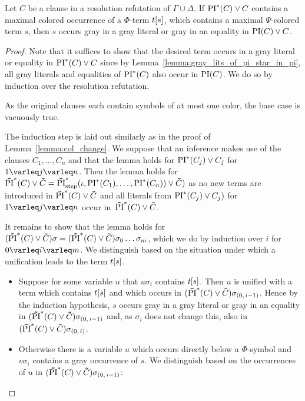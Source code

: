 \documentclass[%
	draft=false,%
	numbers=noendperiod,%
	11pt,%
	a4paper,%
	oneside,%
	openany,%
]{memoir}
\begin{document}
\begin{lemma}
	\label{lemma:subterm_in_gray_lit}
	Let $C$ be a clause in a resolution refutation of $\Gamma \cup \Delta$.
	If $\operatorname{PI}^*(C) \lor C$ contains a maximal colored occurrence of a $\Phi$-term $t[s]$, which contains a maximal $\Psi$-colored term $s$, then $s$ occurs gray in a gray literal or gray in an equality in $\operatorname{PI}(C) \lor C$.
\end{lemma}
\begin{proof}
	Note that it suffices to show that the desired term occurs in a gray literal or equality in $\operatorname{PI}^*(C) \lor C$
	since by Lemma~\ref{lemma:gray_lits_of_pi_star_in_pi}, all gray literals and equalities of $\operatorname{PI}^*(C)$ also occur in $\operatorname{PI}(C)$.
	We do so by induction over the resolution refutation.
	
	As the original clauses each contain symbols of at most one color, the base case is vacuously true.

	The induction step is laid out similarly as in the proof of Lemma~\ref{lemma:col_change}. 
	We suppose that an inference makes use of the clauses $C_1, \dots, C_n$ and that the lemma holds for $\operatorname{PI}^*(C_j) \lor C_j$ for $1\varleq j \varleq n$. 
	Then the lemma holds for $\bm\tilde{\operatorname{PI}}^{*}(C)\lor \bm\tilde{C} = \bm\tilde{\operatorname{PI}}^{*}_{\mathrm{step}}(\iota, \operatorname{PI}^*(C_1), \dots, \operatorname{PI}^*(C_n)) \lor \bm\tilde{C})$ as no new terms are introduced in $\bm\tilde{\operatorname{PI}}^{*}(C)\lor \bm\tilde{C}$ and all literals from $\operatorname{PI}^*(C_j) \lor C_j)$ for $1\varleq j \varleq n$ occur in~$\bm\tilde{\operatorname{PI}}^{*}(C)\lor \bm\tilde{C}$.

	It remains to show that the lemma holds for $(\bm\tilde{\operatorname{PI}}^{*}(C)\lor \bm\tilde{C})\sigma = (\bm\tilde{\operatorname{PI}}^{*}(C)\lor \bm\tilde{C})\sigma_0 \dots \sigma_m$, which we do by induction over $i$ for $0 \varleq i \varleq m$.
	We distinguish based on the situation under which a unification leads to the term $t[s]$.

	\begin{itemize}
		\item 
			Suppose for some variable $u$ that $u\sigma_i$ contains $t[s]$. 
			Then $u$ is unified with a term which contains $t[s]$ and which occurs in $(\bm\tilde{\operatorname{PI}}^{*}(C)\lor \bm\tilde{C})\sigma_{(0,\,i-1)}$.
			Hence by the induction hypothesis, $s$ occurs gray in a gray literal or gray in an equality in $(\bm\tilde{\operatorname{PI}}^{*}(C)\lor \bm\tilde{C})\sigma_{(0,\,i-1)}$ and, as $\sigma_i$ does not change this, also in $(\bm\tilde{\operatorname{PI}}^{*}(C)\lor \bm\tilde{C})\sigma_{(0,\,i)}$.

		\item 
			Otherwise there is a variable $u$ which occurs directly below a $\Phi$-symbol and $v\sigma_i$ contains a gray occurrence of $s$.
			We distinguish based on the occurrences of $u$ in $(\bm\tilde{\operatorname{PI}}^{*}(C)\lor \bm\tilde{C})\sigma_{(0,\,i-1)}$:


\end{itemize}
\end{proof}
\end{document}
